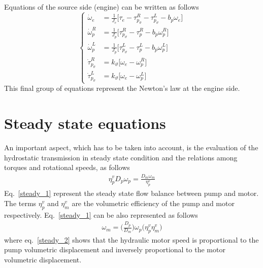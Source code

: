 \documentclass[11pt,a4paper,oneside]{book}
\begin{document}
\begin{onehalfspace}
Equations of the source side (engine) can be written as follows
\begin{equation}\left\lbrace 
	\begin{aligned}
		\dot{\omega}_e &=\frac{1}{J_e}\Big[\tau_e -\tau_{p_\vartheta}^{R}-\tau_{p_\vartheta}^{L} - b_p\omega_e\Big] \\[8pt]
		\dot{\omega}_p^R &=\frac{1}{J_p}\Big[\tau_{p_\vartheta}^{R}-\tau_p^R - b_p\omega_p^R\Big] \\[8pt]
		\dot{\omega}_p^L &=\frac{1}{J_p}\Big[\tau_{p_\vartheta}^{L}-\tau_p^L - b_p\omega_p^L\Big] \\[8pt]
		\dot{\tau}_{p_\vartheta}^{R} &= k_\vartheta \Big[ \omega_e - \omega_p^R\Big] \\[8pt]
		\dot{\tau}_{p_\vartheta}^{L} &= k_\vartheta \Big[ \omega_e - \omega_p^L\Big]
	\end{aligned}\right. 
\end{equation}
This final group of equations represent the Newton's law at the engine side.

\section{Steady state equations}
An important aspect, which has to be taken into account, is the evaluation of the hydrostatic transmission in steady state condition and the relations among torques and rotational speeds, as follows
\begin{equation}\label{steady_1}
	\begin{aligned}
		\eta_p^vD_p\omega_p=\frac{D_m\omega_m}{\eta_p^v}
	\end{aligned}
\end{equation}
Eq.~\eqref{steady_1} represent the steady state flow balance between pump and motor. The terms $\eta_p^v$ and $\eta_m^v$ are the volumetric efficiency of the pump and motor respectively. Eq.~\eqref{steady_1} can be also represented as follows
\begin{equation}\label{steady_2}
	\boxed{	\begin{aligned}
			\omega_m=\Bigg(\frac{D_p}{D_m}\Bigg)\omega_p\Big(\eta_p^v\eta_m^v\Big)
	\end{aligned}}
\end{equation}
where eq.~\eqref{steady_2} shows that the hydraulic motor speed is proportional to the pump volumetric displacement and inversely proportional to the motor volumetric displacement.


\end{onehalfspace}
\end{document}
